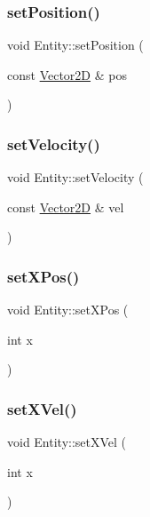 \subsubsection{\texorpdfstring{set\+Position()}{setPosition()}}
{\footnotesize\ttfamily void Entity\+::set\+Position (\begin{DoxyParamCaption}\item[{const \hyperlink{_vector2_d_8hpp_aa1f1145650f1dd9bddf7335ec6434d7c}{Vector2D} \&}]{pos }\end{DoxyParamCaption})\hspace{0.3cm}{\ttfamily [inline]}}

\mbox{\label{class_entity_af41c73b5b2a7e68a7f285b12d0dab9f1}} 
\subsubsection{\texorpdfstring{set\+Velocity()}{setVelocity()}}
{\footnotesize\ttfamily void Entity\+::set\+Velocity (\begin{DoxyParamCaption}\item[{const \hyperlink{_vector2_d_8hpp_aa1f1145650f1dd9bddf7335ec6434d7c}{Vector2D} \&}]{vel }\end{DoxyParamCaption})\hspace{0.3cm}{\ttfamily [inline]}}

\mbox{\label{class_entity_a8afb8aa252cbbffecc2dff0669cb2896}} 
\subsubsection{\texorpdfstring{set\+X\+Pos()}{setXPos()}}
{\footnotesize\ttfamily void Entity\+::set\+X\+Pos (\begin{DoxyParamCaption}\item[{int}]{x }\end{DoxyParamCaption})\hspace{0.3cm}{\ttfamily [inline]}}

\mbox{\label{class_entity_a7f20a2190046121150e5903ec769e9dc}} 
\subsubsection{\texorpdfstring{set\+X\+Vel()}{setXVel()}}
{\footnotesize\ttfamily void Entity\+::set\+X\+Vel (\begin{DoxyParamCaption}\item[{int}]{x }\end{DoxyParamCaption})\hspace{0.3cm}{\ttfamily [inline]}}

